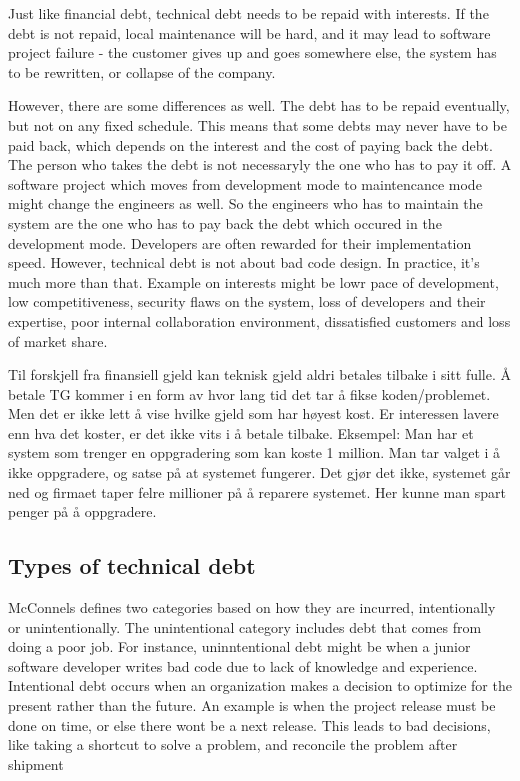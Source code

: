 Just like financial debt, technical debt needs to be repaid with interests\cite{wiki:techdebt}. If the debt is not repaid, local maintenance will be hard, and it may lead to software project failure - the customer gives up and goes somewhere else, the system has to be rewritten, or collapse of the company. 

However, there are some differences as well. The debt has to be repaid eventually, but not on any fixed schedule. This means that some debts may never have to be paid back, which depends on the interest and the cost of paying back the debt. The person who takes the debt is not necessaryly the one who has to pay it off. A software project which moves from development mode to maintencance mode might change the engineers as well. So the engineers who has to maintain the system are the one who has to pay back the debt which occured in the development mode. Developers are often rewarded for their implementation speed. However, technical debt is not about bad code design. In practice, it's much more than that. Example on interests might be lowr pace of development, low competitiveness, security flaws on the system, loss of developers and their expertise, poor internal collaboration environment, dissatisfied customers and loss of market share\cite{p50-allman}.


Til forskjell fra finansiell gjeld kan teknisk gjeld aldri betales tilbake i sitt fulle. Å betale TG kommer i en form av hvor lang tid det tar å fikse koden/problemet. Men det er ikke lett å vise hvilke gjeld som har høyest kost. Er interessen lavere enn hva det koster, er det ikke vits i å betale tilbake. Eksempel: Man har et system som trenger en oppgradering som kan koste 1 million. Man tar valget i å ikke oppgradere, og satse på at systemet fungerer. Det gjør det ikke, systemet går ned og firmaet taper felre millioner på å reparere systemet. Her kunne man spart penger på å oppgradere.



\subsection{Types of technical debt}

McConnels defines two categories based on how they are incurred, intentionally or unintentionally. The unintentional category includes debt that comes from doing a poor job. For instance, uninntentional debt might be when a junior software developer writes bad code due to lack of knowledge and experience. Intentional debt occurs when an organization makes a decision to optimize for the present rather than the future. An example is when the project release must be done on time, or else there wont be a next release. This leads to bad decisions, like taking a shortcut to solve a problem, and reconcile the problem after shipment

